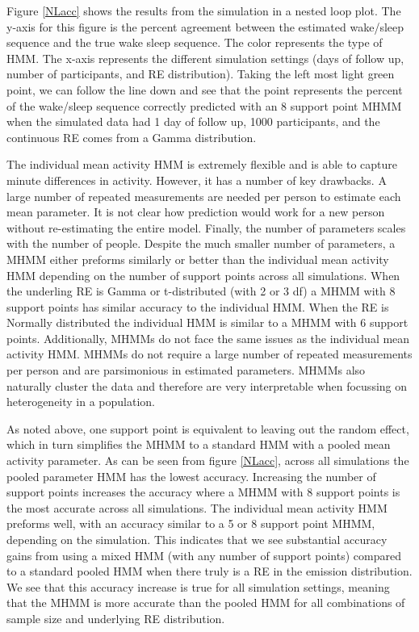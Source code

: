 \documentclass{article}
\begin{document}
Figure \ref{NLacc} shows the results from the simulation in a nested loop plot. The y-axis for this figure is the percent agreement between the estimated wake/sleep sequence and the true wake sleep sequence. 
The color represents the type of HMM. 
The x-axis represents the different simulation settings (days of follow up, number of participants, and RE distribution). 
Taking the left most light green point, we can follow the line down and see 
that the point represents the percent of the wake/sleep sequence 
correctly predicted with an 8 support point MHMM when the simulated data had 1 day of follow up, 1000 
participants, and the continuous RE comes from a Gamma distribution.

The individual mean activity HMM is extremely flexible and is able to capture minute differences in activity. However, it has a number of key drawbacks. A large number of repeated measurements are needed per person to estimate each mean parameter. It is not clear how prediction would work for a new person without re-estimating the entire model. Finally, the number of parameters scales with the number of people. Despite the much smaller number of parameters, a MHMM either preforms similarly or better than the individual mean activity HMM depending on the number of support points across all simulations. When the underling RE is Gamma or t-distributed (with 2 or 3 df) a MHMM with 8 support points has similar accuracy to the individual HMM. When the RE is Normally distributed the individual HMM is similar to a MHMM with 6 support points. Additionally, MHMMs do not face the same issues as the individual mean activity HMM. MHMMs do not require a large number of repeated measurements per person and are parsimonious in estimated parameters. MHMMs also naturally cluster the data and therefore are very interpretable when focussing on heterogeneity in a population. 

As noted above, one support point is equivalent to leaving out the 
random effect, which in turn simplifies the MHMM to a standard HMM with a pooled mean activity parameter. 
As can be seen from figure \ref{NLacc}, across all simulations the pooled parameter HMM has the lowest accuracy. Increasing the number of support points increases the accuracy where a MHMM with 8 support points is the most accurate across all simulations. The individual mean activity HMM preforms well, with an accuracy similar to a 5 or 8 support point MHMM, depending on the simulation. This indicates that we see substantial accuracy gains from using a mixed HMM  (with any number of support points) compared to a standard pooled HMM when there truly is a RE in the emission distribution. We see that this accuracy increase 
is true for all simulation settings, meaning that the MHMM is more 
accurate than the pooled HMM for all combinations of sample size and underlying RE distribution. 
 
\end{document}
